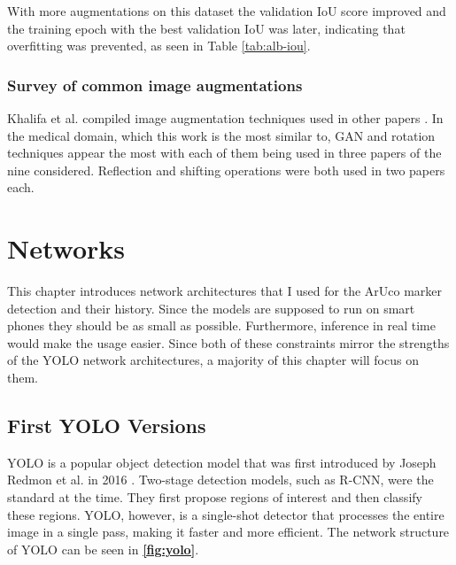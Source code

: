 \documentclass[10pt]{book}
\newcommand{\figureref}[1]{\textbf{\autoref{#1}}}
\begin{document}
With more augmentations on this dataset the validation \ac{IoU} score improved and the training epoch with the best validation \ac{IoU} was later, indicating that overfitting was prevented, as seen in Table \ref{tab:alb-iou}.

\subsection{Survey of common image augmentations}

Khalifa et al. compiled image augmentation techniques used in other papers \cite{khalifa2022comprehensive}. In the medical domain, which this work is the most similar to, \ac{GAN} and rotation techniques appear the most with each of them being used in three papers of the nine considered. Reflection and shifting operations were both used in two papers each.

\chapter{Networks}
\label{chap:netw}

This chapter introduces network architectures that I used for the \ac{ArUco} marker detection and their history. Since the models are supposed to run on smart phones they should be as small as possible. Furthermore, inference in real time would make the usage easier. Since both of these constraints mirror the strengths of the \ac{YOLO} network architectures, a majority of this chapter will focus on them.

\section{First YOLO Versions}

\ac{YOLO} is a popular object detection model that was first introduced by Joseph Redmon et al. in 2016 \cite{redmon2016you}. Two-stage detection models, such as R-CNN, were the standard at the time. They first propose regions of interest and then classify these regions. \ac{YOLO}, however, is a single-shot detector that processes the entire image in a single pass, making it faster and more efficient. The network structure of \ac{YOLO} can be seen in \figureref{fig:yolo}.
\end{document}
